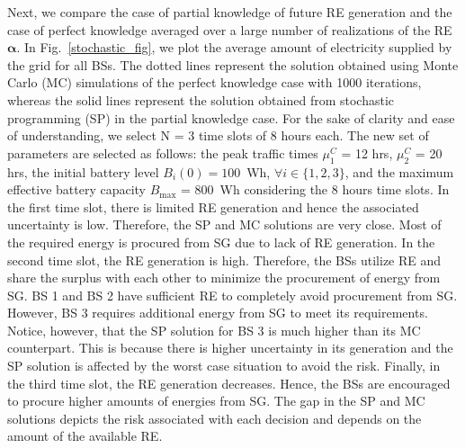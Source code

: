 \documentclass[10pt, letter,twocolumn]{IEEEtran}
\begin{document}
Next, we compare the case of partial knowledge of future RE generation and the case of perfect knowledge averaged over a large number of realizations of the RE $\boldsymbol{\alpha}$. In Fig.~\ref{stochastic_fig}, we plot the average amount of electricity supplied by the grid for all BSs. The dotted lines represent the solution obtained using Monte Carlo (MC) simulations of the perfect knowledge case with 1000 iterations, whereas the solid lines represent the solution obtained from stochastic programming (SP) in the partial knowledge case. For the sake of clarity and ease of understanding, we select N = 3 time slots of 8 hours each. The new set of parameters are selected as follows: the peak traffic times $\mu^{C}_{1}$ = 12 hrs, $\mu^{C}_{2}$ = 20 hrs, the initial battery level $B_{i}(0) = 100$~Wh, $\forall i \in \{1,2,3\}$, and the maximum effective battery capacity $B_{\max}$ = 800~Wh considering the 8 hours time slots. In the first time slot, there is limited RE generation and hence the associated uncertainty is low. Therefore, the SP and MC solutions are very close. Most of the required energy is procured from SG due to lack of RE generation. In the second time slot, the RE generation is high. Therefore, the BSs utilize RE and share the surplus with each other to minimize the procurement of energy from SG. BS 1 and BS 2 have sufficient RE to completely avoid procurement from SG. However, BS 3 requires additional energy from SG to meet its requirements. Notice, however, that the SP solution for BS 3 is much higher than its MC counterpart. This is because there is higher uncertainty in its generation and the SP solution is affected by the worst case situation to avoid the risk. Finally, in the third time slot, the RE generation decreases. Hence, the BSs are encouraged to procure higher amounts of energies from SG. The gap in the SP and MC solutions depicts the risk associated with each decision and depends on the amount of the available RE. %







%
\vspace{-0.0cm}
\end{document}

